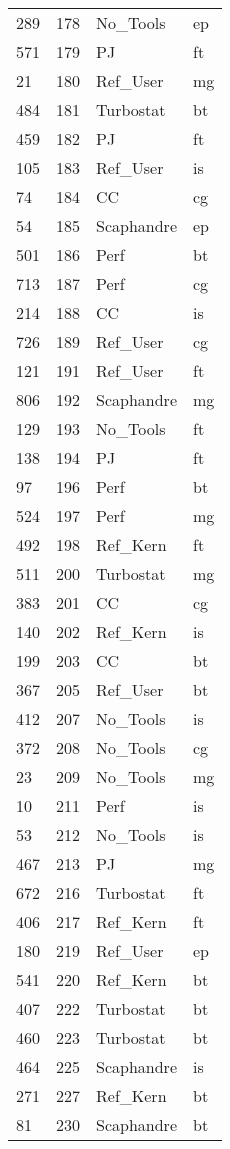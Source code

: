 \begin{tabular}{lrll}
289 & 178 & No_Tools & ep \\
571 & 179 & PJ & ft \\
21 & 180 & Ref_User & mg \\
484 & 181 & Turbostat & bt \\
459 & 182 & PJ & ft \\
105 & 183 & Ref_User & is \\
74 & 184 & CC & cg \\
54 & 185 & Scaphandre & ep \\
501 & 186 & Perf & bt \\
713 & 187 & Perf & cg \\
214 & 188 & CC & is \\
726 & 189 & Ref_User & cg \\
121 & 191 & Ref_User & ft \\
806 & 192 & Scaphandre & mg \\
129 & 193 & No_Tools & ft \\
138 & 194 & PJ & ft \\
97 & 196 & Perf & bt \\
524 & 197 & Perf & mg \\
492 & 198 & Ref_Kern & ft \\
511 & 200 & Turbostat & mg \\
383 & 201 & CC & cg \\
140 & 202 & Ref_Kern & is \\
199 & 203 & CC & bt \\
367 & 205 & Ref_User & bt \\
412 & 207 & No_Tools & is \\
372 & 208 & No_Tools & cg \\
23 & 209 & No_Tools & mg \\
10 & 211 & Perf & is \\
53 & 212 & No_Tools & is \\
467 & 213 & PJ & mg \\
672 & 216 & Turbostat & ft \\
406 & 217 & Ref_Kern & ft \\
180 & 219 & Ref_User & ep \\
541 & 220 & Ref_Kern & bt \\
407 & 222 & Turbostat & bt \\
460 & 223 & Turbostat & bt \\
464 & 225 & Scaphandre & is \\
271 & 227 & Ref_Kern & bt \\
81 & 230 & Scaphandre & bt \\

\end{tabular}
